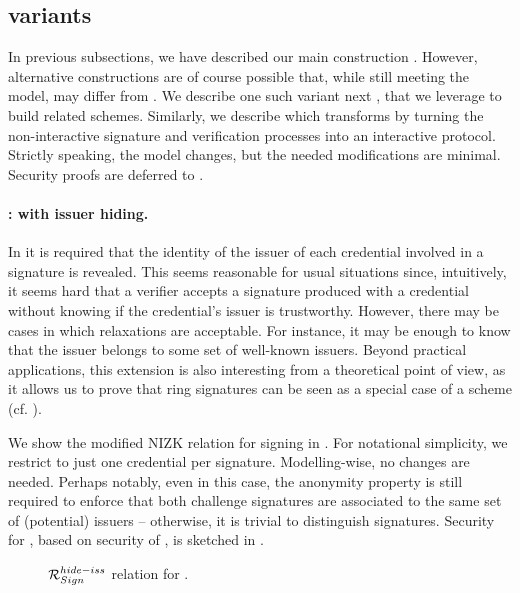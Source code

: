 
\subsection{\CUASGen variants}
\label{ssec:variants}

In previous subsections, we have described our main construction \CUASGen. 
However, alternative constructions are of course possible that, while
still meeting the \UAS model, may differ from \CUASGen. We describe one such
variant next \CUASGenHideIss, that we leverage to build related schemes.
%
Similarly, we describe \CUASGenInt which transforms \CUASGen by turning the
non-interactive signature and verification processes into an interactive
protocol. Strictly speaking, the model changes, but the needed modifications
are minimal.
%
Security proofs are deferred to .

\paragraph{\CUASGenHideIss: \RelSig with issuer hiding.} %
In \CUASGen it is required that the identity of the
issuer of each credential involved in a signature is revealed. This seems
reasonable for usual situations since, intuitively, it seems hard that a
verifier accepts a signature produced with a credential without knowing if the
credential's issuer is trustworthy. However, there may be cases in which
relaxations are acceptable. For instance, it may be enough to know that the
issuer belongs to some set of well-known issuers. Beyond practical applications,
this extension is also interesting from a theoretical point of view, as it
allows us to prove that ring signatures can be seen as a special case of a \UAS
scheme (cf. ). 

We show the modified NIZK relation for signing in . For
notational simplicity, we restrict to just one credential per signature.
%
Modelling-wise, no changes are needed. Perhaps notably, even in this case, the
anonymity property is still required to enforce that both challenge signatures
are associated to the same set of (potential) issuers -- otherwise, it is
trivial to distinguish signatures. Security for \CUASGenHideIss, based on
security of \CUASGen, is sketched in .

\begin{figure}[ht!]
  \scalebox{0.9}{
    
  }
  \caption{$\mathcal{R}^{hide-iss}_{Sign}$ relation for \CUASGenHideIss.}
  \label{fig:nizk-ring}
\end{figure}


